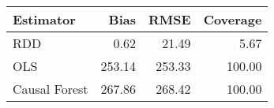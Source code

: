 \begin{table}[ht]
\centering
\begin{tabular}{lrrr}
  \hline
Estimator & Bias & RMSE & Coverage \\ 
  \hline
RDD & 0.62 & 21.49 & 5.67 \\ 
  OLS & 253.14 & 253.33 & 100.00 \\ 
  Causal Forest & 267.86 & 268.42 & 100.00 \\ 
   \hline
\end{tabular}
\end{table}
